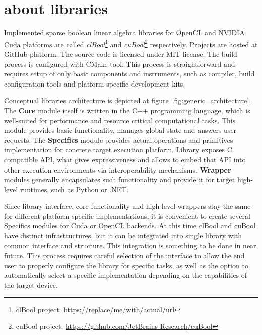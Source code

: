 \section{about libraries}



Implemented sparse boolean linear algebra libraries for OpenCL and NVIDIA Cuda platforms are called
\textit{clBool}\footnote{clBool project: \url{https://replace/me/with/actual/url}} and \textit{cuBool}\footnote{cuBool project: \url{https://github.com/JetBrains-Research/cuBool}} respectively.
Projects are hosted at GitHub platform. The source code is licensed under MIT license.
The build process is configured with CMake tool. 
This process is straightforward and requires setup of only basic components and instruments, such as compiler, build configuration tools and platform-specific development kits.

Conceptual libraries architecture is depicted at figure~\ref{fig:generic_architecture}. 
The \textbf{Core} module itself is written in the C++ programming language, which is well-suited for performance and resource critical computational tasks. 
This module provides basic functionality, manages global state and answers user requests. 
The \textbf{Specifics} module provides actual operations and primitives implementation for concrete target execution platform.
Library exposes C compatible API, what gives expressiveness and allows to embed that API into other execution environments via interoperability mechanisms.
\textbf{Wrapper} modules generally encapsulates such functionality and provide it for target high-level runtimes, such as Python or .NET. 

Since library interface, core functionality and high-level wrappers stay the same for different platform specific implementations, it is convenient to create several Specifics modules for Cuda or OpenCL backends.
At this time clBool and cuBool have distinct infrastructures, but it can be integrated into single library with common interface and structure. 
This integration is something to be done in near future.
This process requires careful selection of the interface to allow the end user to properly configure the library for specific tasks, as well as the option to automatically select a specific implementation depending on the capabilities of the target device.

